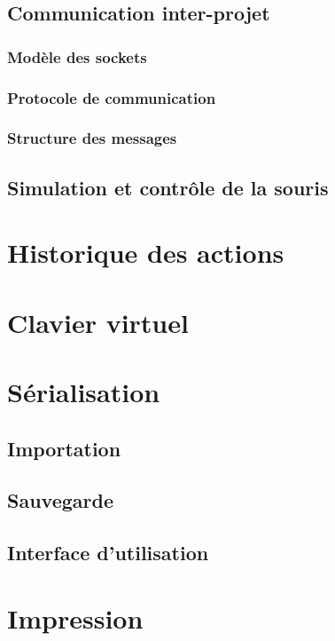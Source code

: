\documentclass[11pt,a4paper,oldfontcommands]{memoir}
\begin{document}
\subsection{Communication inter-projet}

\subsubsection{Modèle des sockets}

\subsubsection{Protocole de communication}

\subsubsection{Structure des messages}

\subsection{Simulation et contrôle de la souris}

\section{Historique des actions}

\section{Clavier virtuel}

\section{Sérialisation}

\subsection{Importation}

\subsection{Sauvegarde}

\subsection{Interface d'utilisation}

\section{Impression}
\end{document}
